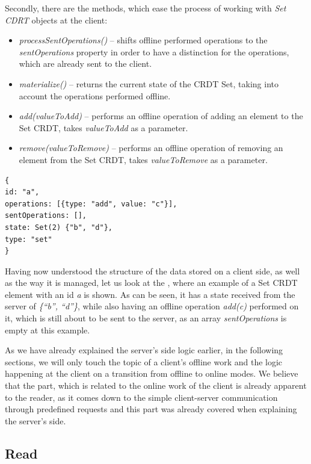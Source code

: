 Secondly, there are the methods, which ease the process of working with \textit{Set CDRT} objects at the client: 

         \begin{itemize}
         \item \textit{processSentOperations()} -- shifts offline performed operations to the \textit{sentOperations} property in order to have a distinction for the operations, which are already sent to the client.
         \item \textit{materialize()} -- returns the current state of the CRDT Set, taking into account the operations performed offline.
         \item \textit{add(valueToAdd)} -- performs an offline operation of adding an element to the Set CRDT, takes \textit{valueToAdd} as a parameter.
          \item \textit{remove(valueToRemove)} -- performs an offline operation of removing an element from the Set CRDT, takes \textit{valueToRemove} as a parameter.
     \end{itemize}

\begin{lstlisting}[caption={An example of a \textit{SetCRDT} object, stored on a client side.}, label={lst:dev8}]
{
id: "a",
operations: [{type: "add", value: "c"}],
sentOperations: [],
state: Set(2) {"b", "d"},
type: "set"
}
\end{lstlisting}
     
Having now understood the structure of the data stored on a client side, as well as the way it is managed, let us look at the , where an example of a Set CRDT element with an id \textit{a} is shown. As can be seen, it has a state received from the server of \textit{\{``b'', ``d''\}}, while also having an offline operation \textit{add(c)} performed on it, which is still about to be sent to the server, as an array \textit{sentOperations} is empty at this example.

As we have already explained the server's side logic earlier, in the following sections, we will only touch the topic of a client's offline work and the logic happening at the client on a transition from offline to online modes. We believe that the part, which is related to the online work of the client is already apparent to the reader, as it comes down to the simple client-server communication through predefined requests and this part was already covered when explaining the server's side. 

\subsection*{Read}

